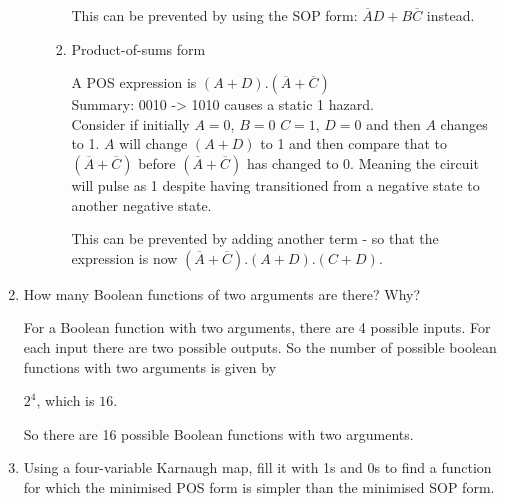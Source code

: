 \documentclass[10pt,\jkfside,a4paper]{article}
\begin{document}
\begin{enumerate}
\begin{enumerate}
\begin{enumerate}
This can be prevented by using the SOP form: $\overline AD + B\overline C$ instead.

\item{Product-of-sums form}

A POS expression is $(A + D).(\overline A + \overline C)$ \\
Summary: 0010 -> 1010 causes a static 1 hazard.\\
Consider if initially $A=0$, $B=0$ $C=1$, $D=0$ and then $A$ changes to 1. $A$ will change $(A + D)$ to 1 and then compare that to $(\overline A + \overline C)$ before $(\overline A + \overline C)$ has changed to 0.
Meaning the circuit will pulse as 1 despite having transitioned from a negative state to another negative state.

This can be prevented by adding another term - so that the expression is now $(\overline A + \overline C).(A + D).(C + D)$.

\end{enumerate}
\end{enumerate}

\item{How many Boolean functions of two arguments are there? Why?}

For a Boolean function with two arguments, there are 4 possible inputs. For each input there are two possible outputs. So the number of possible boolean functions with two arguments is given by 

$2^4$, which is $16$.

So there are 16 possible Boolean functions with two arguments.

\item{Using a four-variable Karnaugh map, fill it with 1s and 0s to find a function for which the minimised POS form is simpler than the minimised SOP form.}


\end{enumerate}
\end{document}
